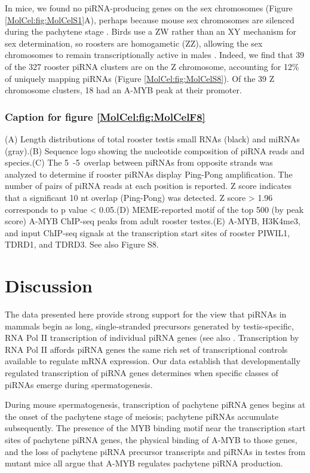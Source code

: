    In mice, we found no piRNA-producing genes on the sex chromosomes (Figure \ref{MolCel:fig:MolCelS1}A), perhaps because mouse sex chromosomes are silenced during the pachytene stage \citep{Li2009d}. Birds use a ZW rather than an XY mechanism for sex determination, so roosters are homogametic (ZZ), allowing the sex chromosomes to remain transcriptionally active in males \citep{Namekawa2009, Schoenmakers2009}. Indeed, we find that 39 of the 327 rooster piRNA clusters are on the Z chromosome, accounting for 12\% of uniquely mapping piRNAs (Figure \ref{MolCel:fig:MolCelS8}). Of the 39 Z chromosome clusters, 18 had an A-MYB peak at their promoter.

    \subsubsection{Caption for figure \ref{MolCel:fig:MolCelF8}}
    \label{MolCel:subsubsection:cap:Figure F8}
      (A) Length distributions of total rooster testis small RNAs (black) and miRNAs (gray).(B) Sequence logo showing the nucleotide composition of piRNA reads and species.(C) The 5\textprime~-5\textprime~overlap between piRNAs from opposite strands was analyzed to determine if rooster piRNAs display Ping-Pong amplification. The number of pairs of piRNA reads at each position is reported. Z score indicates that a significant 10 nt overlap (Ping-Pong) was detected. Z score > 1.96 corresponds to p value < 0.05.(D) MEME-reported motif of the top 500 (by peak score) A-MYB ChIP-seq peaks from adult rooster testes.(E) A-MYB, H3K4me3, and input ChIP-seq signals at the transcription start sites of rooster PIWIL1, TDRD1, and TDRD3. See also Figure S8.

\section{Discussion}
  \label{MolCel:sec:Discussion}

  The data presented here provide strong support for the view that piRNAs in mammals begin as long, single-stranded precursors generated by testis-specific, RNA Pol II transcription of individual piRNA genes (see also \citet{Vourekas2012}. Transcription by RNA Pol II affords piRNA genes the same rich set of transcriptional controls available to regulate mRNA expression. Our data establish that developmentally regulated transcription of piRNA genes determines when specific classes of piRNAs emerge during spermatogenesis.

  During mouse spermatogenesis, transcription of pachytene piRNA genes begins at the onset of the pachytene stage of meiosis; pachytene piRNAs accumulate subsequently. The presence of the MYB binding motif near the transcription start sites of pachytene piRNA genes, the physical binding of A-MYB to those genes, and the loss of pachytene piRNA precursor transcripts and piRNAs in testes from \amyb{} mutant mice all argue that A-MYB regulates pachytene piRNA production.

